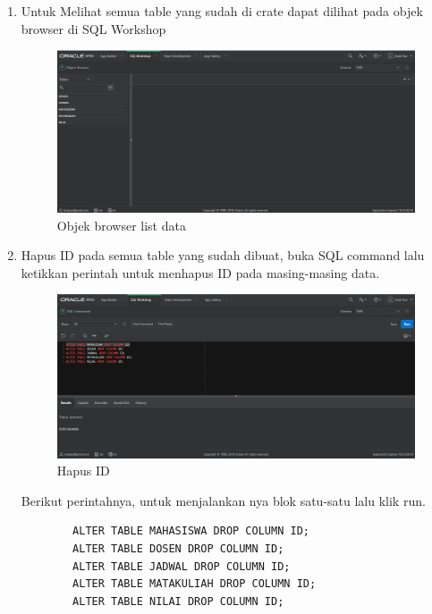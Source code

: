\begin{enumerate}
    \item Untuk Melihat semua table yang sudah di crate dapat dilihat pada objek browser di SQL Workshop
    \begin{figure}[!htbp]
        \centering
        \includegraphics[width=13cm]{figures/4.PNG}
        \caption{Objek browser list data}
    \end{figure}
    \newpage
    
    \item Hapus ID pada semua table yang sudah dibuat, buka SQL command lalu ketikkan perintah untuk menhapus ID pada masing-masing data.
        \begin{figure}[!htbp]
        \centering
        \includegraphics[width=13cm]{figures/5.PNG}
        \caption{Hapus ID}
    \end{figure}
    
    Berikut perintahnya, untuk menjalankan nya blok satu-satu lalu klik run.
    \begin{verbatim}
        ALTER TABLE MAHASISWA DROP COLUMN ID;
        ALTER TABLE DOSEN DROP COLUMN ID;
        ALTER TABLE JADWAL DROP COLUMN ID;
        ALTER TABLE MATAKULIAH DROP COLUMN ID;
        ALTER TABLE NILAI DROP COLUMN ID;
    \end{verbatim}
    

\end{enumerate}
